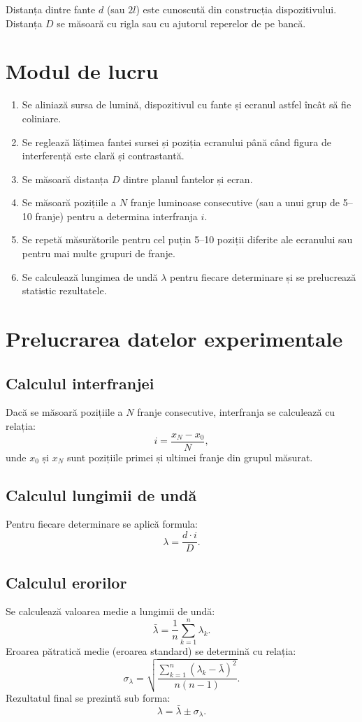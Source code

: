 \documentclass[12pt,a4paper]{article}
\begin{document}
Distanța dintre fante \(d\) (sau \(2l\)) este cunoscută din construcția dispozitivului. Distanța \(D\) se măsoară cu rigla sau cu ajutorul reperelor de pe bancă.

\section{Modul de lucru}
\begin{enumerate}
    \item Se aliniază sursa de lumină, dispozitivul cu fante și ecranul astfel încât să fie coliniare.
    \item Se reglează lățimea fantei sursei și poziția ecranului până când figura de interferență este clară și contrastantă.
    \item Se măsoară distanța \(D\) dintre planul fantelor și ecran.
    \item Se măsoară pozițiile a \(N\) franje luminoase consecutive (sau a unui grup de 5–10 franje) pentru a determina interfranja \(i\).
    \item Se repetă măsurătorile pentru cel puțin 5–10 poziții diferite ale ecranului sau pentru mai multe grupuri de franje.
    \item Se calculează lungimea de undă \(\lambda\) pentru fiecare determinare și se prelucrează statistic rezultatele.
\end{enumerate}

\section{Prelucrarea datelor experimentale}
\subsection*{Calculul interfranjei}
Dacă se măsoară pozițiile a \(N\) franje consecutive, interfranja se calculează cu relația:
\[
i = \frac{x_N - x_0}{N},
\]
unde \(x_0\) și \(x_N\) sunt pozițiile primei și ultimei franje din grupul măsurat.

\subsection*{Calculul lungimii de undă}
Pentru fiecare determinare se aplică formula:
\[
\lambda = \frac{d \cdot i}{D}.
\]

\subsection*{Calculul erorilor}
Se calculează valoarea medie a lungimii de undă:
\[
\bar{\lambda} = \frac{1}{n}\sum_{k=1}^{n} \lambda_k.
\]
Eroarea pătratică medie (eroarea standard) se determină cu relația:
\[
\sigma_\lambda = \sqrt{\frac{\sum_{k=1}^{n} (\lambda_k - \bar{\lambda})^2}{n(n-1)}}.
\]
Rezultatul final se prezintă sub forma:
\[
\lambda = \bar{\lambda} \pm \sigma_\lambda.
\]
\end{document}
